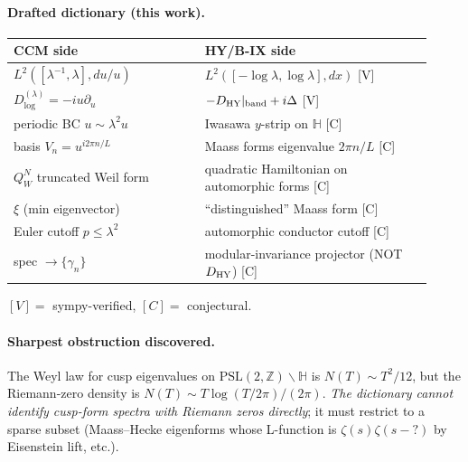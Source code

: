 \documentclass[11pt]{article}
\begin{document}
\paragraph{Drafted dictionary (this work).}
\begin{center}\small
\begin{tabular}{p{0.42\linewidth} p{0.50\linewidth}}
\toprule
\textbf{CCM side} & \textbf{HY/B-IX side} \\
\midrule
\(L^2([\lambda^{-1},\lambda], du/u)\) & \(L^2([-\log\lambda, \log\lambda], dx)\) [V] \\
\(D_{\log}^{(\lambda)}=-i u\partial_u\) & \(-D_{\rm HY}|_{\rm band}+i\Delta\) [V] \\
periodic BC \(u\sim\lambda^2 u\) & Iwasawa \(y\)-strip on \(\mathbb H\) [C] \\
basis \(V_n=u^{i 2\pi n/L}\) & Maass forms eigenvalue \(2\pi n/L\) [C] \\
\(Q_W^N\) truncated Weil form & quadratic Hamiltonian on automorphic forms [C] \\
\(\xi\) (min eigenvector) & ``distinguished'' Maass form [C] \\
Euler cutoff \(p\le\lambda^2\) & automorphic conductor cutoff [C] \\
spec \(\to\{\gamma_n\}\) & modular-invariance projector (NOT \(D_{\rm HY}\)) [C] \\
\bottomrule
\end{tabular}\par\smallskip
\([V]=\) sympy-verified, \([C]=\) conjectural.
\end{center}

\paragraph{Sharpest obstruction discovered.} The Weyl law for cusp
eigenvalues on \(\mathrm{PSL}(2,\mathbb Z)\backslash\mathbb H\) is
\(N(T)\sim T^2/12\), but the Riemann-zero density is
\(N(T)\sim T\log(T/2\pi)/(2\pi)\). \emph{The dictionary cannot identify
cusp-form spectra with Riemann zeros directly}; it must restrict to a
sparse subset (Maass--Hecke eigenforms whose L-function is
\(\zeta(s)\zeta(s-?)\) by Eisenstein lift, etc.).
\end{document}

